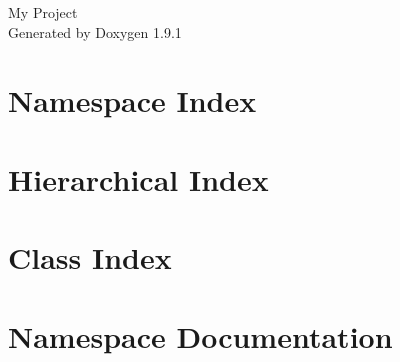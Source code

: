 \let\mypdfximage\pdfximage\def\pdfximage{\immediate\mypdfximage}\documentclass[twoside]{book}
\newcommand{\+}{\discretionary{\mbox{\scriptsize$\hookleftarrow$}}{}{}}
\newcommand{\clearemptydoublepage}{%
  \newpage{\pagestyle{empty}\cleardoublepage}%
}
\begin{document}
\raggedbottom

\hypersetup{pageanchor=false,
             bookmarksnumbered=true,
             pdfencoding=unicode
            }
\begin{titlepage}
\vspace*{7cm}
\begin{center}%
{\Large My Project }\\
\vspace*{1cm}
{\large Generated by Doxygen 1.9.1}\\
\end{center}
\end{titlepage}
\clearemptydoublepage
{}
\tableofcontents
\clearemptydoublepage
{}
\hypersetup{pageanchor=true}

\chapter{Namespace Index}

\chapter{Hierarchical Index}

\chapter{Class Index}

\chapter{Namespace Documentation}



\end{document}
